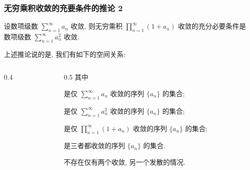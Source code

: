 \begin{frame}
\frametitle{无穷乘积收敛的充要条件的推论 2}

\begin{cor}
设数项级数 $\sum_{n=1}^\infty a_n$ 收敛, 则无穷乘积 $\prod_{n=1}^\infty (1 + a_n)$ 收敛的充分必要条件是数项级数 $\sum_{n=1}^\infty a_n^2$ 收敛.
\end{cor}

\pause
\vspace{0.5em}

上述推论说的是, 我们有如下的空间关系:
\begin{columns}
\begin{column}{0.4\textwidth}
\begin{center}
\end{center}
\end{column}
\begin{column}{0.5\textwidth}
其中

 是仅 $\sum_{n=1}^\infty a_n$ 收敛的序列 $\{a_n\}$ 的集合;

 是仅 $\sum_{n=1}^\infty a_n^2$ 收敛的序列 $\{a_n\}$ 的集合;

 是仅 $\prod_{n=1}^\infty (1 + a_n)$ 收敛的序列 $\{a_n\}$ 的集合;

 是三者都收敛的序列 $\{a_n\}$ 的集合.

\begin{attnblock}
不存在仅有两个收敛, 另一个发散的情况.
\end{attnblock}
\end{column}
\end{columns}

\end{frame}


